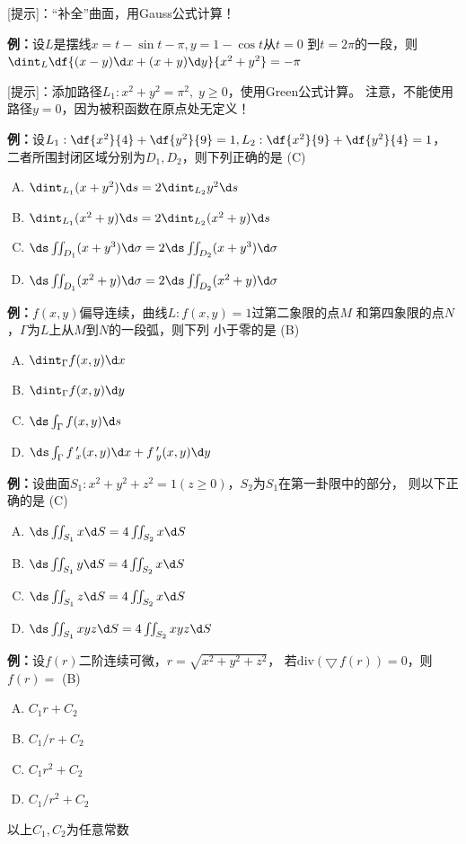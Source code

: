 [提示]：“补全”曲面，用Gauss公式计算！

{\bf 例：}设$L$是摆线$x=t-\sin t-\pi,y=1-\cos t$从$t=0$
到$t=2\pi$的一段，则$\dint_L\df{(x-y)\d x+(x+y)\d y}{x^2+y^2}=-\pi$

[提示]：添加路径$L_1:x^2+y^2=\pi^2,\;y\geq 0$，使用Green公式计算。
注意，不能使用路径$y=0$，因为被积函数在原点处无定义！

{\bf 例：}设$L_1:\df{x^2}{4}+\df{y^2}{9}=1,L_2:\df{x^2}{9}+\df{y^2}{4}=1$，
二者所围封闭区域分别为$D_1,D_2$，则下列正确的是\;
(C)
\begin{enumerate}[(A)]
  \item $\dint_{L_1}(x+y^2)\d s=2\dint_{L_2}y^2\d s$
  \item $\dint_{L_1}(x^2+y)\d s=2\dint_{L_2}(x^2+y)\d s$
  \item $\ds\iint_{D_1}(x+y^3)\d\sigma=2\ds\iint_{D_2}(x+y^3)\d\sigma$
  \item $\ds\iint_{D_1}(x^2+y)\d\sigma=2\ds\iint_{D_2}(x^2+y)\d\sigma$
\end{enumerate}

{\bf 例：}$f(x,y)$偏导连续，曲线$L:f(x,y)=1$过第二象限的点$M$
  和第四象限的点$N$，$\Gamma$为$L$上从$M$到$N$的一段弧，则下列
  小于零的是\;
(B)
  \begin{enumerate}[(A)]
  \setlength{\itemindent}{1cm}
    \item $\dint_{\Gamma}f(x,y)\d x$
    \item $\dint_{\Gamma}f(x,y)\d y$
    \item $\ds\int_{\Gamma}f(x,y)\d s$
    \item $\ds\int_{\Gamma}f\,'_x(x,y)\d x+f\,'_y(x,y)\d y$
  \end{enumerate}

{\bf 例：}设曲面$S_1:x^2+y^2+z^2=1(z\geq
  0)$，$S_2$为$S_1$在第一卦限中的部分，
  则以下正确的是\;
  (C) 
  \begin{enumerate}[(A)]
  \setlength{\itemindent}{1cm}
    \item $\ds\iint_{S_1}x\d S=4\iint_{S_2}x\d S$
    \item $\ds\iint_{S_1}y\d S=4\iint_{S_2}x\d S$
    \item $\ds\iint_{S_1}z\d S=4\iint_{S_2}x\d S$
    \item $\ds\iint_{S_1}xyz\d S=4\iint_{S_2}xyz\d S$
  \end{enumerate}

{\bf 例：}设$f(r)$二阶连续可微，$r=\sqrt{x^2+y^2+z^2}$，
  若$\mathrm{div}(\bigtriangledown\,f(r))=0$，则$f(r)=$\;
  (B) 
  \begin{enumerate}[(A)]
  \setlength{\itemindent}{1cm}
    \item $C_1r+C_2$
    \item $C_1/r+C_2$
    \item $C_1r^2+C_2$
    \item $C_1/r^2+C_2$
  \end{enumerate}
  以上$C_1,C_2$为任意常数

